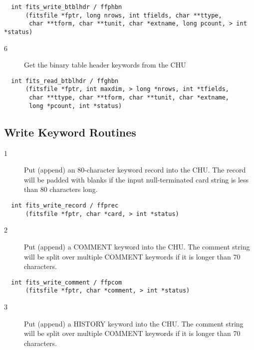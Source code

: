 \begin{verbatim}
  int fits_write_btblhdr / ffphbn
      (fitsfile *fptr, long nrows, int tfields, char **ttype,
       char **tform, char **tunit, char *extname, long pcount, > int *status)
\end{verbatim}

\begin{description}
\item[6 ]Get the binary table header keywords from the CHU
\end{description}

\begin{verbatim}
  int fits_read_btblhdr / ffghbn
      (fitsfile *fptr, int maxdim, > long *nrows, int *tfields,
       char **ttype, char **tform, char **tunit, char *extname,
       long *pcount, int *status)
\end{verbatim}


\subsection{ Write Keyword Routines  \label{FFPREC}}


\begin{description}
\item[1 ]Put (append) an 80-character keyword record into the CHU.  The
   record will be padded with blanks if the input null-terminated
  card string is less than 80 characters long.
\end{description}

\begin{verbatim}
  int fits_write_record / ffprec
      (fitsfile *fptr, char *card, > int *status)
\end{verbatim}

\begin{description}
\item[2 ] Put (append) a COMMENT keyword into the CHU.  The comment string will
   be split over multiple COMMENT keywords if it is longer than 70 characters.
\end{description}

\begin{verbatim}
  int fits_write_comment / ffpcom
      (fitsfile *fptr, char *comment, > int *status)
\end{verbatim}

\begin{description}
\item[3 ]Put (append) a HISTORY keyword into the CHU.  The comment string will
  be split over multiple COMMENT keywords if it is longer than 70 characters.
\end{description}

